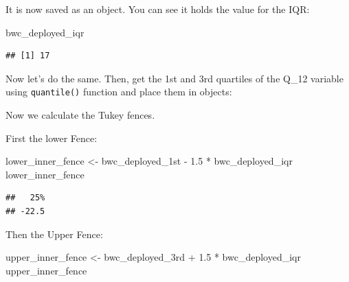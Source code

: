 \documentclass[
]{book}
\newenvironment{Shaded}{\begin{snugshade}}{\end{snugshade}}
\newcommand{\AttributeTok}[1]{\textcolor[rgb]{0.77,0.63,0.00}{#1}}
\newcommand{\ConstantTok}[1]{\textcolor[rgb]{0.00,0.00,0.00}{#1}}
\newcommand{\FloatTok}[1]{\textcolor[rgb]{0.00,0.00,0.81}{#1}}
\newcommand{\FunctionTok}[1]{\textcolor[rgb]{0.00,0.00,0.00}{#1}}
\newcommand{\NormalTok}[1]{#1}
\newcommand{\OtherTok}[1]{\textcolor[rgb]{0.56,0.35,0.01}{#1}}
\newcommand{\SpecialCharTok}[1]{\textcolor[rgb]{0.00,0.00,0.00}{#1}}
\begin{document}
It is now saved as an object. You can see it holds the value for the IQR:

\begin{Shaded}
\begin{Highlighting}[]
\NormalTok{bwc\_deployed\_iqr}
\end{Highlighting}
\end{Shaded}

\begin{verbatim}
## [1] 17
\end{verbatim}

Now let's do the same. Then, get the 1st and 3rd quartiles of the Q\_12 variable using \texttt{quantile()} function and place them in objects:

\begin{Shaded}
\end{Shaded}

Now we calculate the Tukey fences.

First the lower Fence:

\begin{Shaded}
\begin{Highlighting}[]
\NormalTok{lower\_inner\_fence }\OtherTok{\textless{}{-}}\NormalTok{ bwc\_deployed\_1st }\SpecialCharTok{{-}} \FloatTok{1.5} \SpecialCharTok{*}\NormalTok{ bwc\_deployed\_iqr }
\NormalTok{lower\_inner\_fence}
\end{Highlighting}
\end{Shaded}

\begin{verbatim}
##   25% 
## -22.5
\end{verbatim}

Then the Upper Fence:

\begin{Shaded}
\begin{Highlighting}[]
\NormalTok{upper\_inner\_fence }\OtherTok{\textless{}{-}}\NormalTok{ bwc\_deployed\_3rd }\SpecialCharTok{+} \FloatTok{1.5} \SpecialCharTok{*}\NormalTok{ bwc\_deployed\_iqr }
\NormalTok{upper\_inner\_fence}
\end{Highlighting}
\end{Shaded}
\end{document}
